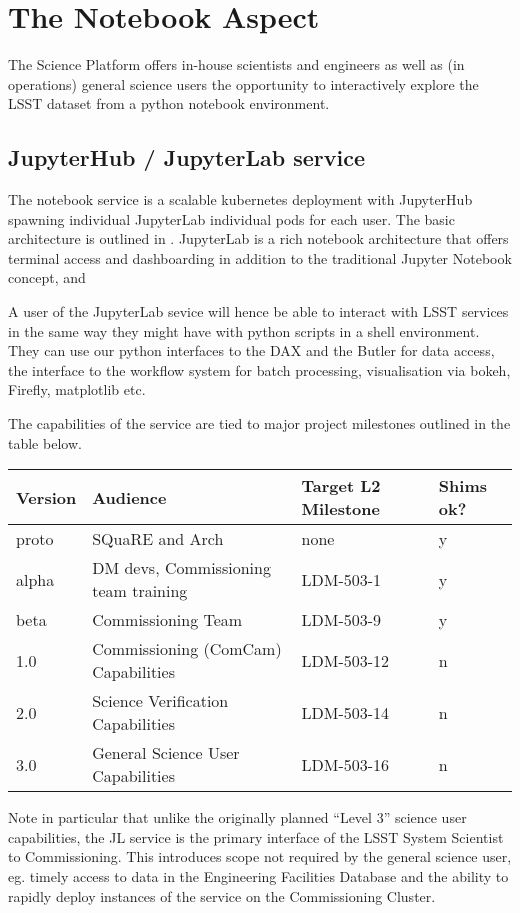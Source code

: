\section{The Notebook Aspect}\label{notebook-aspect}

The Science Platform offers in-house scientists and engineers as well as (in operations) general science users the opportunity to interactively explore the LSST dataset from a python notebook environment.

\subsection{JupyterHub / JupyterLab service}\label{jupyterhub-jupyterlab-service}

The notebook service is a scalable kubernetes deployment with JupyterHub spawning individual JupyterLab individual pods for each user. The basic architecture is outlined in . JupyterLab is a rich notebook architecture that offers terminal access and dashboarding in addition to the traditional Jupyter Notebook concept, and

A user of the JupyterLab sevice will hence be able to interact with LSST services in the same way they might have with python scripts in a shell environment. They can use our python interfaces to the DAX and the Butler for data access, the interface to the workflow system for batch processing, visualisation via bokeh, Firefly, matplotlib etc. 

The capabilities of the service are tied to major project milestones outlined in the table below.

\begin{footnotesize}
\begin{longtable}[c]{|l|l|l|l|}
\toprule
Version & Audience & Target L2 Milestone & Shims ok?\tabularnewline
\midrule
\endhead
proto & SQuaRE and Arch & none & y\tabularnewline
alpha & DM devs, Commissioning team training & LDM-503-1 &
y\tabularnewline
beta & Commissioning Team & LDM-503-9 & y\tabularnewline
1.0 & Commissioning (ComCam) Capabilities & LDM-503-12 &
n\tabularnewline
2.0 & Science Verification Capabilities & LDM-503-14 & n\tabularnewline
3.0 & General Science User Capabilities & LDM-503-16 & n\tabularnewline
\bottomrule
\end{longtable}
\end{footnotesize}

Note in particular that unlike the originally planned ``Level 3'' science user capabilities, the JL service is the primary interface of the LSST System Scientist to Commissioning. This introduces scope not required by the general science user, eg. timely access to data in the Engineering Facilities Database and the ability to rapidly deploy instances of the service on the Commissioning Cluster.

